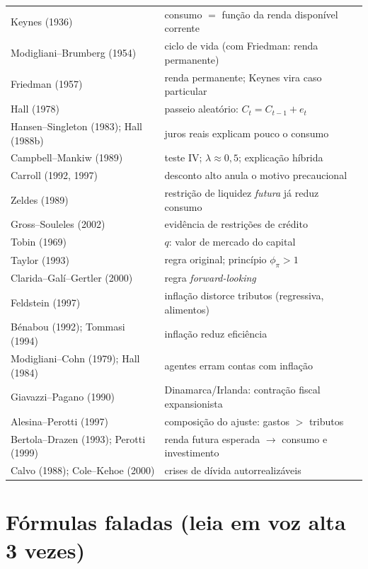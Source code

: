 \documentclass[12pt, a4paper]{article}
\begin{document}
\begin{resultbox}[title={Nome $\to$ uma linha}]
\renewcommand{\arraystretch}{1.2}
\begin{tabular}{p{5.2cm} p{8.3cm}}
\toprule
Keynes (1936) & consumo $=$ função da renda disponível corrente \\
Modigliani--Brumberg (1954) & ciclo de vida (com Friedman: renda permanente) \\
Friedman (1957) & renda permanente; Keynes vira caso particular \\
Hall (1978) & passeio aleatório: $C_t = C_{t-1} + e_t$ \\
Hansen--Singleton (1983); Hall (1988b) & juros reais explicam pouco o
consumo \\
Campbell--Mankiw (1989) & teste IV; $\lambda \approx 0{,}5$; explicação
híbrida \\
Carroll (1992, 1997) & desconto alto anula o motivo precaucional \\
Zeldes (1989) & restrição de liquidez \emph{futura} já reduz consumo \\
Gross--Souleles (2002) & evidência de restrições de crédito \\
Tobin (1969) & $q$: valor de mercado do capital \\
Taylor (1993) & regra original; princípio $\phi_\pi > 1$ \\
Clarida--Galí--Gertler (2000) & regra \emph{forward-looking} \\
Feldstein (1997) & inflação distorce tributos (regressiva, alimentos) \\
Bénabou (1992); Tommasi (1994) & inflação reduz eficiência \\
Modigliani--Cohn (1979); Hall (1984) & agentes erram contas com inflação \\
Giavazzi--Pagano (1990) & Dinamarca/Irlanda: contração fiscal expansionista \\
Alesina--Perotti (1997) & composição do ajuste: gastos $>$ tributos \\
Bertola--Drazen (1993); Perotti (1999) & renda futura esperada $\to$ consumo
e investimento \\
Calvo (1988); Cole--Kehoe (2000) & crises de dívida autorrealizáveis \\
\bottomrule
\end{tabular}
\end{resultbox}

\section{Fórmulas faladas (leia em voz alta 3 vezes)}
\end{document}
